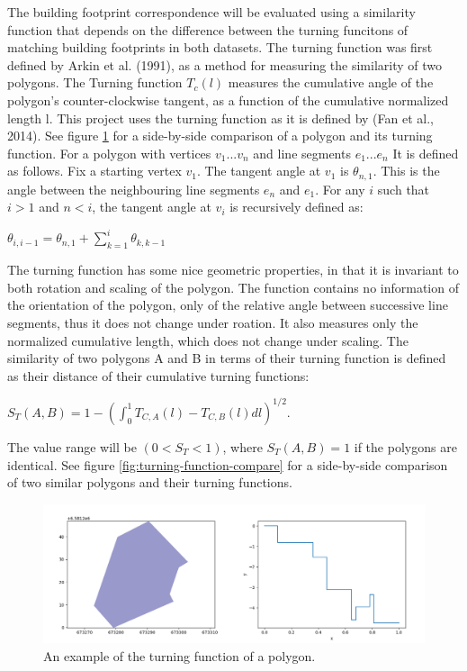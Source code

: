 \documentclass[a4paper]{article}
\begin{document}
The building footprint correspondence will be evaluated using a similarity function that depends on the difference between the turning funcitons of matching building footprints in both datasets.
The turning function was first defined by Arkin et al. (1991), as a method for measuring the similarity of two polygons.
The Turning function $T_c(l)$ measures the cumulative angle of the polygon's counter-clockwise tangent, as a function of the cumulative normalized length l.
This project uses the turning function as it is defined by (Fan et al., 2014).
See figure \ref{fig:turning-function} for a side-by-side comparison of a polygon and its turning function.
For a polygon with vertices ${v_1 ... v_n}$ and line segments ${e_1 ... e_n}$ It is defined as follows.
Fix a starting vertex $v_1$.
The tangent angle at $v_1$ is $\theta_{n,1}$. This is the angle between the neighbouring line segments $e_n$ and $e_1$.
For any $i$ such that $i>1$ and $n<i$, the tangent angle at $v_i$ is recursively defined as:
\begin{center}
    $\theta_{i, i-1} = \theta_{n,1} + \sum^{i}_{k=1} \theta_{k, k-1}$
\end{center}
The turning function has some nice geometric properties, in that it is invariant to both rotation and scaling of the polygon. The function contains no information of the orientation of the polygon, only of the relative angle between successive line segments, thus it does not change under roation. It also measures only the normalized cumulative length, which does not change under scaling.
The similarity of two polygons A and B in terms of their turning function is defined as their distance of their cumulative turning functions:
\begin{center}
    $S_{T}(A, B) = 1 - (\int^{1}_{0} T_{C,A}(l) - T_{C,B}(l) dl)^{1/2}$.
\end{center}
The value range will be $(0 < S_{T} < 1)$, where $S_{T}(A,B) = 1$ if the polygons are identical. 
See figure \ref{fig:turning-function-compare} for a side-by-side comparison of two similar polygons and their turning functions.

\begin{figure}[H]
    \centering
    \includegraphics[width=\textwidth,height=0.5\textheight,keepaspectratio]{img_turn_function}
    \caption{An example of the turning function of a polygon.}
    \label{fig:turning-function}
\end{figure}
\end{document}
